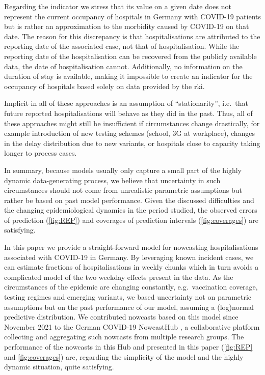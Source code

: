 Regarding the indicator we stress that its value on a given date does
not represent the current occupancy of hospitals in Germany with
COVID-19 patients but is rather an approximation to the morbidity caused
by COVID-19 on that date. The reason for this discrepancy is that
hospitalisations are attributed to the reporting date of the associated
case, not that of hospitalisation. While the reporting date of the
hospitalisation can be recovered from the publicly available data, the
date of hospitalisation cannot. Additionally, no information on the
duration of stay is available, making it impossible to create an
indicator for the occupancy of hospitals based solely on data provided
by the \gls{rki}.

Implicit in all of these approaches is an assumption of
``stationarity'', i.e.~that future reported hospitalisations will behave
as they did in the past. Thus, all of these approaches might still be
insufficient if circumstances change drastically, for example
introduction of new testing schemes (school, 3G at workplace), changes
in the delay distribution due to new variants, or hospitals close to
capacity taking longer to process cases.

In summary, because models usually only capture a small part of the
highly dynamic data-generating process, we believe that uncertainty in
such circumstances should not come from unrealistic parametric
assumptions but rather be based on past model performance. Given the
discussed difficulties and the changing epidemiological dynamics in the
period studied, the observed errors of prediction (\cref{fig:REP})
and coverages of prediction intervals (\cref{fig:coverages}) are
satisfying.

In this paper we provide a straight-forward model for nowcasting
hospitalisations associated with COVID-19 in Germany. By leveraging
known incident cases, we can estimate fractions of hospitalisations in
weekly chunks which in turn avoids a complicated model of the two
weekday effects present in the data. As the circumstances of the
epidemic are changing constantly, e.g.~vaccination coverage, testing
regimes and emerging variants, we based uncertainty not on parametric
assumptions but on the past performance of our model, assuming a
(log)normal predictive distribution. We contributed nowcasts based on
this model since November 2021 to the German COVID-19 NowcastHub
\citep{2022Nowcasts}, a collaborative platform collecting and
aggregating such nowcasts from multiple research groups. The performance
of the nowcasts in this Hub and presented in this paper (\cref{fig:REP} and \cref{fig:coverages}) are, regarding the simplicity of
the model and the highly dynamic situation, quite satisfying.

